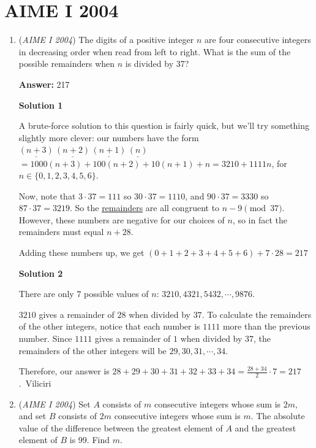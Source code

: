 \section{AIME I 2004}
        \begin{enumerate}
        	\item (\textit{AIME I 2004}) The digits of a positive integer $n$ are four consecutive integers in decreasing order when read from left to right. What is the sum of the possible remainders when $n$ is divided by 37?


 
 \textbf{Answer: }217



\textbf{Solution 1}

A brute-force solution to this question is fairly quick, but we'll try something slightly more clever:  our numbers have the form ${\underline{(n+3)}}\,{\underline{(n+2)}}\,{\underline{( n+1)}}\,{\underline {(n)}}$$= 1000(n + 3) + 100(n + 2) + 10(n + 1) + n = 3210 + 1111n$, for $n \in \lbrace0, 1, 2, 3, 4, 5, 6\rbrace$.

 Now, note that $3\cdot 37 = 111$ so $30 \cdot 37 = 1110$, and $90 \cdot 37 = 3330$ so $87 \cdot 37 = 3219$. So the \href{https://artofproblemsolving.com/wiki/index.php?title=Remainder}{remainders} are all congruent to $n - 9 \pmod{37}$. However, these numbers are negative for our choices of $n$, so in fact the remainders must equal $n + 28$.

 Adding these numbers up, we get $(0 + 1 + 2 + 3 + 4 + 5 + 6) + 7\cdot28 = \boxed{217}$




\textbf{Solution 2}

There are only $7$ possible values of $n$: $3210, 4321, 5432, \cdots, 9876$. 

 $3210$ gives a remainder of $28$ when divided by $37$. To calculate the remainders of the other integers, notice that each number is $1111$ more than the previous number. Since $1111$ gives a remainder of $1$ when divided by $37$, the remainders of the other integers will be $29, 30, 31, \cdots, 34$. 

 Therefore, our answer is $28 + 29 + 30 + 31 + 32 + 33 + 34 = \frac{28 + 34}{2} \cdot 7 = \boxed{217}$.~Viliciri

 


	\item (\textit{AIME I 2004}) Set $A$ consists of $m$ consecutive integers whose sum is $2m,$ and set $B$ consists of $2m$ consecutive integers whose sum is $m.$ The absolute value of the difference between the greatest element of $A$ and the greatest element of $B$ is 99. Find $m.$


\end{enumerate}
